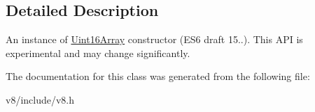 \subsection{Detailed Description}
An instance of \hyperlink{classv8_1_1Uint16Array}{Uint16\+Array} constructor (E\+S6 draft 15..). This A\+P\+I is experimental and may change significantly. 

The documentation for this class was generated from the following file\+:\begin{DoxyCompactItemize}
\item 
v8/include/v8.\+h\end{DoxyCompactItemize}
